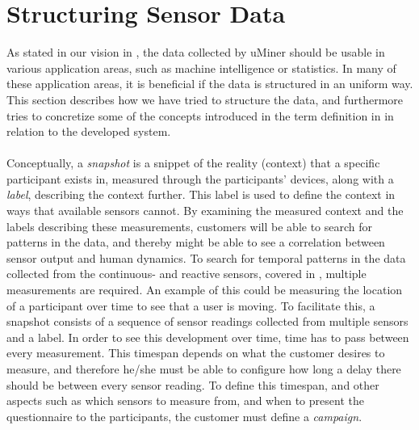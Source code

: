 
\section{Structuring Sensor Data}
\label{sec:modeling_sensor_data}

As stated in our vision in , the data collected by uMiner should be usable in various application areas, such as machine intelligence or statistics. In many of these application areas, it is beneficial if the data is structured in an uniform way. This section describes how we have tried to structure the data, and furthermore tries to concretize some of the concepts introduced in the term definition in  in relation to the developed system. 
\\\\
Conceptually, a \emph{snapshot} is a snippet of the reality (context) that a specific participant exists in, measured through the participants' devices, along with a \emph{label}, describing the context further. This label is used to define the context in ways that available sensors cannot. By examining the measured context and the labels describing these measurements, customers will be able to search for patterns in the data, and thereby might be able to see a correlation between sensor output and human dynamics. To search for temporal patterns in the data collected from the continuous- and reactive sensors, covered in , multiple measurements are required. An example of this could be measuring the location of a participant over time to see that a user is moving. To facilitate this, a snapshot consists of a sequence of sensor readings collected from multiple sensors and a label. In order to see this development over time, time has to pass between every measurement. This timespan depends on what the customer desires to measure, and therefore he/she must be able to configure how long a delay there should be between every sensor reading. To define this timespan, and other aspects such as which sensors to measure from, and when to present the questionnaire to the participants, the customer must define a \emph{campaign}.
\\\\

